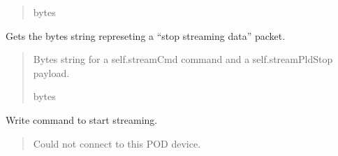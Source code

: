 \documentclass[letterpaper,10pt,english]{sphinxmanual}
\begin{document}
\begin{fulllineitems}
\begin{fulllineitems}
\begin{quote}
\begin{description}
\sphinxAtStartPar
bytes

\end{description}\end{quote}

\end{fulllineitems}


\begin{fulllineitems}
\label{\detokenize{PodApi.Stream:PodApi.Stream.DeviceValve.Valve.GetStopBytes}}
\pysigstartsignatures
{}
\pysigstopsignatures
\sphinxAtStartPar
Gets the bytes string represeting a “stop streaming data” packet.
\begin{quote}\begin{description}
\sphinxAtStartPar
Bytes string for a self.streamCmd command and a                 self.streamPldStop payload.

\sphinxAtStartPar
bytes

\end{description}\end{quote}

\end{fulllineitems}


\begin{fulllineitems}
\label{\detokenize{PodApi.Stream:PodApi.Stream.DeviceValve.Valve.Open}}
\pysigstartsignatures
{}
\pysigstopsignatures
\sphinxAtStartPar
Write command to start streaming.
\begin{quote}\begin{description}
\sphinxAtStartPar
{} \textendash{} Could not connect to this POD device.

\end{description}\end{quote}

\end{fulllineitems}


\end{fulllineitems}
\end{document}
